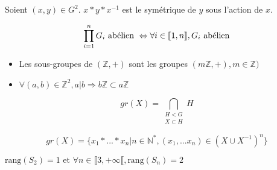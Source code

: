 
\begin{defi}
    Soient $(x,y)\in G^2$. $x*y*x^{-1}$ est le symétrique de $y$ sous l'action de $x$.
\end{defi}

\begin{prop}
    \[\prod_{i=1}^n G_i \text{ abélien } \Leftrightarrow\forall i \in \llbracket 1, n \rrbracket, G_i \text{ abélien}\]
\end{prop}

\begin{prop}\begin{itemize}
    \item Les sous-groupes de $(\mathbb{Z}, +)$ sont les groupes $(m\mathbb{Z}, +), m\in\mathbb{Z})$
    \item $\forall (a,b) \in \mathbb{Z}^2, a|b \Rightarrow b\mathbb{Z} \subset a\mathbb{Z}$
\end{itemize}\end{prop}

\begin{defi}
    \[gr(X) = \bigcap_{\substack{H<G\\X\subset H}} H\]
\end{defi}

\begin{lemme}\[
    gr(X) = \{x_1* ... * x_n | n\in\mathbb{N}^*, (x_1, ...x_n) \in (X \cup X^{-1})^n \}
\]\end{lemme}

\begin{lemme} $\text{rang}(S_2) = 1 \text{ et } \forall n \in \llbracket 3, +\infty\llbracket, \text{rang}(S_n) = 2$
\end{lemme}

